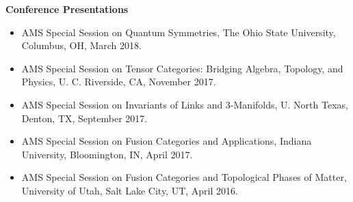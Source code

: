\documentclass[11pt]{article}
\begin{document}


  {\large \textbf{Conference Presentations}}

  \begin{itemize}
    \item[] AMS Special Session on Quantum Symmetries, The Ohio State University, Columbus, OH, March 2018.
    
    \item[] AMS Special Session on Tensor Categories: Bridging Algebra, Topology, and Physics, U. C. Riverside, CA, November 2017.

    \item[] AMS Special Session on Invariants of Links and 3-Manifolds, U. North Texas, Denton, TX, September 2017.

    \item[] AMS Special Session on Fusion Categories and Applications, Indiana University, Bloomington, IN, April 2017.

    \item[] AMS Special Session on Fusion Categories and Topological Phases of Matter, University of Utah, Salt Lake City, UT, April 2016.
  \end{itemize}
  
\end{document}
